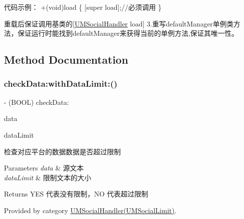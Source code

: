 代码示例： +(void)load \{ \mbox{[}super load\mbox{]};//必须调用 \}

重载后保证调用基类的\mbox{[}\mbox{\hyperlink{interface_u_m_social_handler}{U\+M\+Social\+Handler}} load\mbox{]} 3.重写default\+Manager单例类方法，保证运行时能找到default\+Manager来获得当前的单例方法,保证其唯一性。 

\subsection{Method Documentation}
\mbox{\label{interface_u_m_social_handler_aa40a617ff5de296f940d1bb9de9ca9d6}} 
\subsubsection{\texorpdfstring{check\+Data\+:with\+Data\+Limit\+:()}{checkData:withDataLimit:()}\hspace{0.1cm}{\footnotesize\ttfamily [1/2]}}
{\footnotesize\ttfamily -\/ (B\+O\+OL) check\+Data\+: \begin{DoxyParamCaption}\item[{(N\+S\+Data $\ast$)}]{data }\item[{withDataLimit:(N\+S\+U\+Integer)}]{data\+Limit }\end{DoxyParamCaption}}

检查对应平台的数据数据是否超过限制


\begin{DoxyParams}{Parameters}
{\em data} & 源文本 \\
\hline
{\em data\+Limit} & 限制文本的大小\\
\hline
\end{DoxyParams}
\begin{DoxyReturn}{Returns}
Y\+ES 代表没有限制，\+NO 代表超过限制 
\end{DoxyReturn}


Provided by category \mbox{\hyperlink{category_u_m_social_handler_07_u_m_social_limit_08_aa40a617ff5de296f940d1bb9de9ca9d6}{U\+M\+Social\+Handler(\+U\+M\+Social\+Limit)}}.

\mbox{\label{interface_u_m_social_handler_aa40a617ff5de296f940d1bb9de9ca9d6}} 
